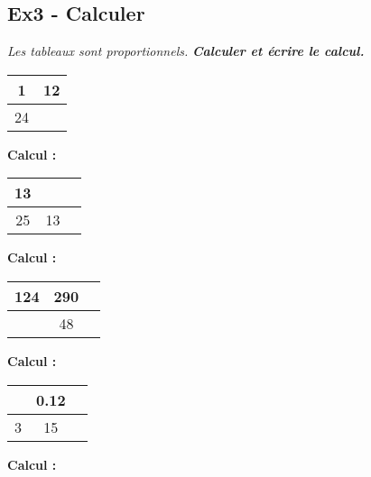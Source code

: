 \documentclass[12pt]{article}
\begin{document}
\subsection*{Ex3 - Calculer}

\textit{Les tableaux sont proportionnels.} \textit{\textbf{Calculer et écrire le calcul.}}

\begin{multicols}{4}

\begin{center}
    \begin{tabular}{|c|c|}
      \hline
      1 & 12  \\  \hline
      24 & \phantom{$\dfrac{\dfrac{123456789}{1}}{1}$}  \\  \hline
    \end{tabular}

    \vspace{0.5cm}
    \textbf{Calcul :}\dotfill 
  \end{center}

  \begin{center}
    \begin{tabular}{|c|c|c|}
      \hline
      13 & \phantom{$\dfrac{\dfrac{123456789}{1}}{1}$} \\  \hline
      25 & 13 \\  \hline
    \end{tabular}

    \vspace{0.5cm}
    \textbf{Calcul :}\dotfill 
  \end{center}

  \begin{center}
    \begin{tabular}{|c|c|c|}
      \hline
      124 & 290 \\  \hline
      \phantom{$\dfrac{\dfrac{123456789}{1}}{1}$} & 48 \\  \hline
    \end{tabular}
    
    \vspace{0.5cm}
    \textbf{Calcul :}\dotfill 
  \end{center}

  \begin{center}
    \begin{tabular}{|c|c|c|}
      \hline
      \phantom{$\dfrac{\dfrac{123456789}{1}}{1}$} & 0.12 \\  \hline
      3 & 15 \\  \hline
    \end{tabular}
    
    \vspace{0.5cm}
    \textbf{Calcul :}\dotfill 
  \end{center}

\end{multicols}
\end{document}
